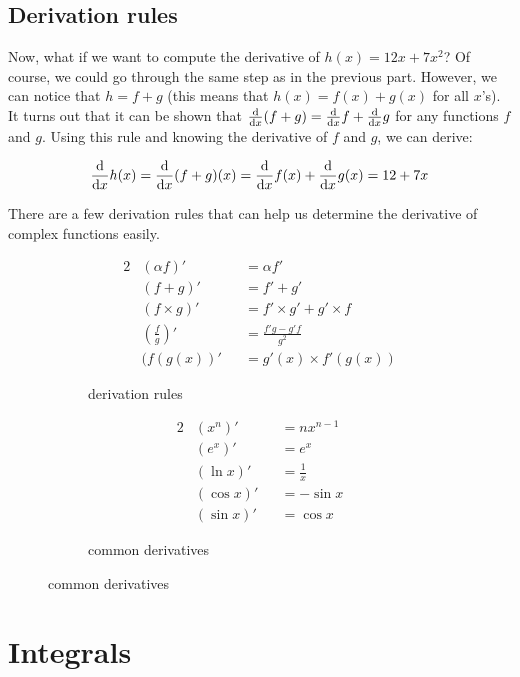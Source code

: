 \subsection{Derivation rules}

Now, what if we want to compute the derivative of $h(x) = 12x +
7x^2$? Of course, we could go through the same step as in the previous
part. However, we can notice that $h = f + g$ (this means that $h(x)
= f(x) + g(x)$ for all $x$'s). It turns out that it can be shown that
$\frac {\mathrm{d}} {\mathrm{d} x} (f+g) = \frac {\mathrm{d}} {\mathrm{d} x} f + \frac {\mathrm{d}} {\mathrm{d} x} g$
for any functions $f$ and $g$. Using this rule and knowing the derivative
of $f$ and $g$, we can derive:

\[
\frac {\mathrm{d}} {\mathrm{d} x} h(x)
= \frac {\mathrm{d}} {\mathrm{d} x} (f+g)(x)
= \frac {\mathrm{d}} {\mathrm{d} x} f(x) + \frac {\mathrm{d}} {\mathrm{d} x} g(x)
= 12 + 7x
\]

There are a few derivation rules that can help us determine the derivative
of complex functions easily.

\begin{figure}[H]
\begin{subfigure}{0.45\textwidth}
\begin{alignat*}{2}
& (\alpha f)'              &&= \alpha f' \\
& (f + g)'                 &&= f' + g' \\
& (f \times g)'            &&= f' \times g' + g' \times f \\
& \left(\frac f g\right)'  &&= \frac {f'g - g'f} {g^2} \\
& (f(g(x))'                &&= g'(x) \times f'(g(x))
\end{alignat*}
\caption{derivation rules}
\end{subfigure}
\begin{subfigure}{0.45\textwidth}
\begin{alignat*}{2}
& (x^n)'    &&= n x^{n-1}   \\
& (e^x)'    &&= e^x         \\
& (\ln x)'  &&= \frac 1 x \\
& (\cos x)' &&= -\sin x \\
& (\sin x)' &&=  \cos x
\end{alignat*}
\caption{common derivatives}
\end{subfigure}
\end{figure}



\section{Integrals}


